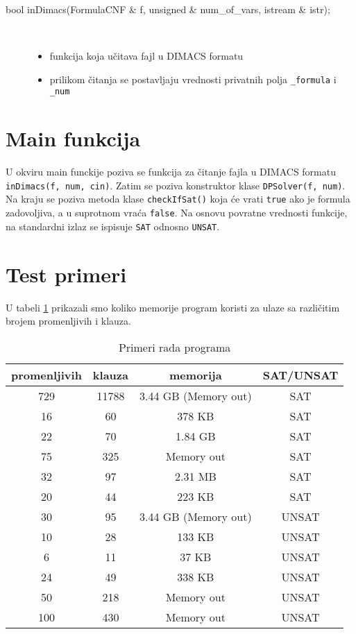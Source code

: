 \documentclass[a4paper, 12pt]{article}
\begin{document}
\begin{description}
	\item[bool inDimacs(FormulaCNF \& f, unsigned \& num\_of\_vars, istream \& istr);] ~ 
	\begin{itemize}
		\item funkcija koja učitava fajl u DIMACS formatu
		\item prilikom čitanja se postavljaju vrednosti privatnih polja \verb|_formula| i \verb|_num|
	\end{itemize}
\end{description}


\section{Main funkcija}

U okviru main funckije poziva se funkcija za čitanje fajla u DIMACS formatu \verb|inDimacs(f, num, cin)|. Zatim se poziva konstruktor klase \verb|DPSolver(f, num)|. Na kraju se poziva metoda klase \verb|checkIfSat()| koja će vrati  \verb|true| ako je formula zadovoljiva, a u suprotnom vraća  \verb|false|. Na osnovu povratne vrednosti funkcije, na standardni izlaz se ispisuje \verb|SAT| odnosno \verb|UNSAT|.



\section{Test primeri}

U tabeli \ref{tab:testPrimeri} prikazali smo koliko memorije program koristi za ulaze sa različitim brojem promenljivih i klauza.


\begin{table}[H]
	\centering
	\label{tab:testPrimeri}
	\caption{Primeri rada programa}
	\begin{tabular}{|c|c|c|c|} 
		\hline
		promenljivih & klauza & memorija & SAT/UNSAT \\
		\hline
		729 & 11788 & 3.44 GB (Memory out) & SAT \\
		\hline
		16 & 60 & 378 KB & SAT \\
		\hline
		22 & 70 & 1.84 GB & SAT \\
		\hline
		75 & 325 & Memory out & SAT \\
		\hline
		32 & 97 & 2.31 MB & SAT \\
		\hline
		20 & 44 & 223 KB & SAT \\
		\hline
		30 & 95 & 3.44 GB (Memory out) & UNSAT \\
		\hline
		10  & 28 & 133 KB & UNSAT \\
		\hline
		6 & 11 & 37 KB & UNSAT \\
		\hline 
		24 & 49 & 338 KB & UNSAT \\
		\hline
		50 & 218 & Memory out & UNSAT \\
		\hline
		100 & 430 & Memory out & UNSAT \\
		\hline
	\end{tabular}
\end{table}
\end{document}
